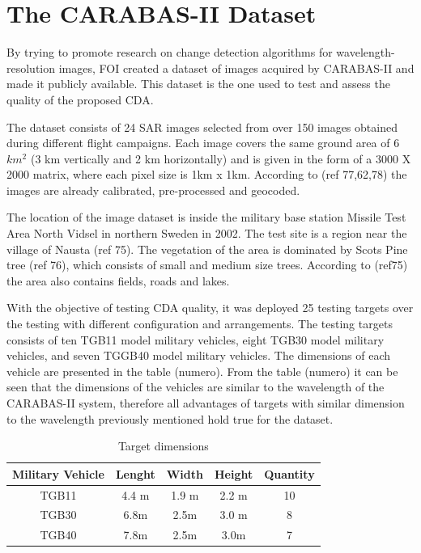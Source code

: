 \section{The CARABAS-II Dataset}

By trying to promote research on change detection algorithms for wavelength-resolution
images, FOI created a dataset of images acquired by CARABAS-II and made it publicly available. 
This dataset is the one used to test and assess the quality of the proposed CDA.

The dataset consists of 24 SAR images selected from over 150 images obtained during different flight campaigns.
Each image covers the same ground area of 6 $km^2$ (3 km vertically and 2 km horizontally)
and is given in the form of a 3000 X 2000 matrix, where each pixel size is 1km x 1km.
According to (ref 77,62,78) the images are already calibrated, pre-processed and geocoded.

The location of the image dataset is inside the military base station Missile Test Area North
Vidsel in northern Sweden in 2002. The test site is a region near the village of Nausta (ref 75).
The vegetation of the area is dominated by Scots Pine tree (ref 76), which consists of small and medium size trees.
According to (ref75) the area also contains fields, roads and lakes.

With the objective of testing CDA quality, it was deployed 25 testing targets over the testing with different configuration 
and arrangements. The testing targets consists of ten TGB11 model military vehicles, eight TGB30 model 
military vehicles, and seven TGGB40 model military vehicles. The dimensions of each vehicle are presented in the table (numero).
From the table (numero) it can be seen that the dimensions of the vehicles are similar to the wavelength of the CARABAS-II system,
therefore all advantages of targets with similar dimension to the wavelength previously mentioned hold true for the dataset.

\begin{table}[h]
    \centering
    \begin{tabular}{|c|c|c|c|c|}
        \hline
        Military Vehicle & Lenght & Width & Height & Quantity \\ \hline
        TGB11 & 4.4 m & 1.9 m & 2.2 m & 10 \\ \hline
        TGB30 & 6.8m & 2.5m & 3.0 m & 8 \\ \hline
        TGB40 & 7.8m & 2.5m & 3.0m & 7 \\ \hline
    \end{tabular}
    \caption{Target dimensions}
    \label{tab:vehicle_dimensions}
\end{table}


